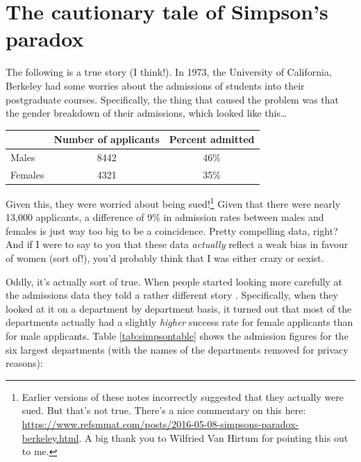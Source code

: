 \documentclass[
]{book}
\begin{document}
\hypertarget{the-cautionary-tale-of-simpsons-paradox}{%
\section{The cautionary tale of Simpson's paradox}\label{the-cautionary-tale-of-simpsons-paradox}}

The following is a true story (I think!). In 1973, the University of California, Berkeley had some worries about the admissions of students into their postgraduate courses. Specifically, the thing that caused the problem was that the gender breakdown of their admissions, which looked like this\ldots{}

\begin{longtable}[]{@{}lcc@{}}
\toprule
& Number of applicants & Percent admitted \\
\midrule
\endhead
Males & 8442 & 46\% \\
Females & 4321 & 35\% \\
\bottomrule
\end{longtable}

Given this, they were worried about being sued!\footnote{Earlier versions of these notes incorrectly suggested that they actually were sued. But that's not true. There's a nice commentary on this here: \url{https://www.refsmmat.com/posts/2016-05-08-simpsons-paradox-berkeley.html}. A big thank you to Wilfried Van Hirtum for pointing this out to me.} Given that there were nearly 13,000 applicants, a difference of 9\% in admission rates between males and females is just way too big to be a coincidence. Pretty compelling data, right? And if I were to say to you that these data \emph{actually} reflect a weak bias in favour of women (sort of!), you'd probably think that I was either crazy or sexist.

Oddly, it's actually sort of true. When people started looking more carefully at the admissions data they told a rather different story \citep{Bickel1975}. Specifically, when they looked at it on a department by department basis, it turned out that most of the departments actually had a slightly \emph{higher} success rate for female applicants than for male applicants. Table \ref{tab:simpsontable} shows the admission figures for the six largest departments (with the names of the departments removed for privacy reasons):
\end{document}
